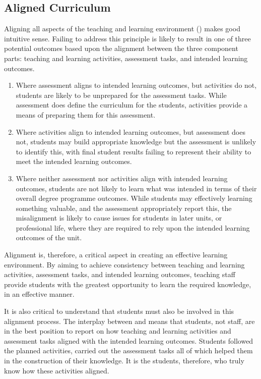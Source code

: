 
\subsection{Aligned Curriculum} %
\label{sub:aligned_curriculum}

Aligning all aspects of the teaching and learning environment () makes good intuitive sense. Failing to address this principle is likely to result in one of three potential outcomes based upon the alignment between the three component parts: teaching and learning activities, assessment tasks, and intended learning outcomes.

\begin{enumerate}
	\item Where assessment aligns to intended learning outcomes, but activities do not, students are likely to be unprepared for the assessment tasks. While assessment does define the curriculum for the students, activities provide a means of preparing them for this assessment. 
	\item Where activities align to intended learning outcomes, but assessment does not, students may build appropriate knowledge but the assessment is unlikely to identify this, with final student results failing to represent their ability to meet the intended learning outcomes. 
	\item Where neither assessment nor activities align with intended learning outcomes, students are not likely to learn what was intended in terms of their overall degree programme outcomes. While students may effectively learning something valuable, and the assessment appropriately report this, the misalignment is likely to cause issues for students in later units, or professional life, where they are required to rely upon the intended learning outcomes of the unit.
\end{enumerate}

Alignment is, therefore, a critical aspect in creating an effective learning environment. By aiming to achieve consistency between teaching and learning activities, assessment tasks, and intended learning outcomes, teaching staff provide students with the greatest opportunity to learn the required knowledge, in an effective manner. 

It is also critical to understand that students must also be involved in this alignment process. The interplay between  and  means that students, not staff, are in the best position to report on how teaching and learning activities and assessment tasks aligned with the intended learning outcomes. Students followed the planned activities, carried out the assessment tasks all of which helped them in the construction of their knowledge. It is the students, therefore, who truly know how these activities aligned.

